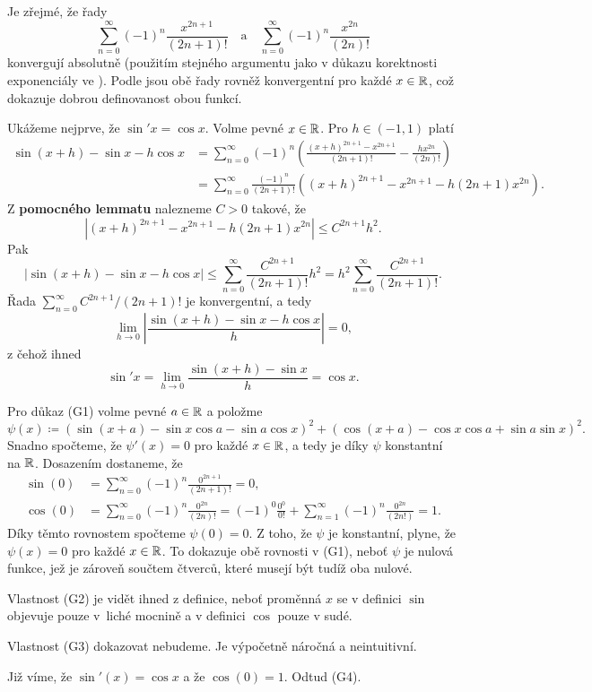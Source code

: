 \begin{thmproof}
 Je zřejmé, že řady
 \[
  \sum_{n=0}^{\infty} (-1)^{n} \frac{x^{2n+1}}{(2n+1)!} \quad \text{a} \quad
  \sum_{n=0}^{\infty} (-1)^{n} \frac{x^{2n}}{(2n)!}
 \]
 konvergují absolutně (použitím stejného argumentu jako v důkazu korektnosti
 exponenciály ve ). Podle
  jsou obě řady rovněž
 konvergentní pro každé $x \in \mathbb{R}$, což dokazuje dobrou definovanost obou
 funkcí.

 Ukážeme nejprve, že $\sin'x = \cos x$. Volme pevné $x \in \mathbb{R}$. Pro $h \in
 (-1,1)$ platí
 \begin{align*}
  \sin(x+h) - \sin x - h \cos x &= \sum_{n=0}^{\infty} (-1)^{n}\left(
  \frac{(x+h)^{2n+1} - x^{2n+1}}{(2n+1)!} - \frac{hx^{2n}}{(2n)!}\right)\\
  &= \sum_{n=0}^{\infty} \frac{(-1)^{n}}{(2n+1)!} ((x+h)^{2n+1} - x^{2n+1} -
  h(2n+1)x^{2n}).
 \end{align*}
 Z \textbf{pomocného lemmatu} nalezneme $C > 0$ takové, že
 \[
  |(x+h)^{2n+1} - x^{2n+1} - h(2n+1)x^{2n}| \leq C^{2n+1}h^2.
 \]
 Pak
 \[
  |\sin(x+h) - \sin x - h\cos x| \leq \sum_{n=0}^{\infty}
  \frac{C^{2n+1}}{(2n+1)!}h^2 = h^2 \sum_{n=0}^{\infty}
  \frac{C^{2n+1}}{(2n+1)!}.
 \]
 Řada $\sum_{n=0}^{\infty} C^{2n+1} / (2n+1)!$ je konvergentní, a tedy
 \[
  \lim_{h \to 0} \left|\frac{\sin(x+h) - \sin x - h \cos x}{h}\right| = 0,
 \]
 z čehož ihned
 \[
  \sin'x = \lim_{h \to 0} \frac{\sin(x+h)-\sin x}{h} = \cos x.
 \]

 Pro důkaz (G1) volme pevné $a \in \mathbb{R}$ a položme
 \[
  \psi(x) \coloneqq (\sin(x + a) - \sin x \cos a - \sin a \cos x)^2
  + (\cos(x + a) - \cos x \cos a + \sin a \sin x)^2.
 \]
 Snadno spočteme, že $\psi'(x) = 0$ pro každé $x \in \mathbb{R}$, a tedy je díky
  $\psi$ konstantní na $\mathbb{R}$.
 Dosazením dostaneme, že
 \begin{align*}
  \sin(0) &= \sum_{n=0}^{\infty} (-1)^{n} \frac{0^{2n+1}}{(2n+1)!} = 0,\\
  \cos(0) &= \sum_{n=0}^{\infty} (-1)^{n} \frac{0^{2n}}{(2n)!} =
  (-1)^{0}\frac{0^{0}}{0!} + \sum_{n=1}^{\infty} (-1)^{n}\frac{0^{2n}}{(2n!)} =
  1.
 \end{align*}
 Díky těmto rovnostem spočteme $\psi(0) = 0$. Z toho, že $\psi$ je konstantní,
 plyne, že $\psi(x) = 0$ pro každé $x \in \mathbb{R}$. To dokazuje obě rovnosti v (G1),
 neboť $\psi$ je nulová funkce, jež je zároveň součtem čtverců, které musejí být
 tudíž oba nulové.

 Vlastnost (G2) je vidět ihned z definice, neboť proměnná $x$ se v definici
 $\sin$ objevuje pouze v~liché mocnině a v definici $\cos$ pouze v sudé.

 Vlastnost (G3) dokazovat nebudeme. Je výpočetně náročná a neintuitivní.

 Již víme, že $\sin'(x) = \cos x$ a že $\cos(0) = 1$. Odtud (G4).
\end{thmproof}

